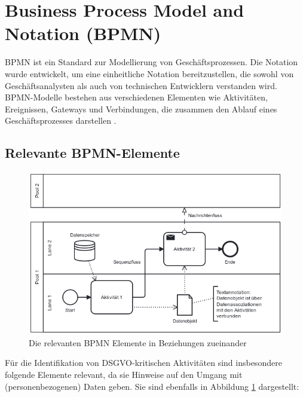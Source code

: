 \section{Business Process Model and Notation (BPMN)}\label{sec:bpmn}

\ac{BPMN} ist ein Standard zur Modellierung von Geschäftsprozessen. Die Notation wurde entwickelt, um eine einheitliche Notation bereitzustellen, die sowohl von Geschäftsanalysten als auch von technischen Entwicklern verstanden wird. \ac{BPMN}-Modelle bestehen aus verschiedenen Elementen wie Aktivitäten, Ereignissen, Gateways und Verbindungen, die zusammen den Ablauf eines Geschäftsprozesses darstellen \cite{omgbpmn}.

\subsection*{Relevante BPMN-Elemente}

\begin{figure}
    \centering
    \includegraphics[width=.7\linewidth]{images/process-models/bpmn-elements-showcase}
    \caption{Die relevanten BPMN Elemente in Beziehungen zueinander}
    \label{fig:bpmn-elements-showcase}
\end{figure}

Für die Identifikation von \ac{DSGVO}-kritischen Aktivitäten sind insbesondere folgende Elemente relevant, da sie Hinweise auf den Umgang mit (personenbezogenen) Daten geben. Sie sind ebenfalls in Abbildung \ref{fig:bpmn-elements-showcase} dargestellt:

